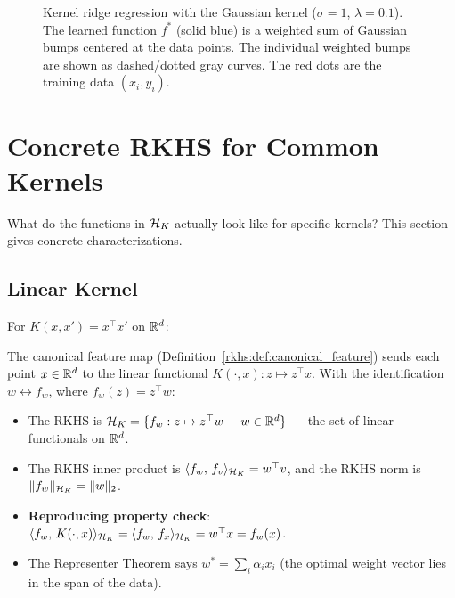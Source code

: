 \begin{notechapter}
\begin{figure}[ht]
\caption{Kernel ridge regression with the Gaussian kernel ($\sigma=1$,
$\lambda=0.1$). The learned function $f^*$ (solid blue) is a weighted
sum of Gaussian bumps centered at the data points. The individual
weighted bumps are shown as dashed/dotted gray curves. The red dots are
the training data $(x_i, y_i)$.}
\label{rkhs:fig:kernel_ridge}
\end{figure}

\section{Concrete RKHS for Common Kernels}
\label{rkhs:sec:examples_rkhs}

What do the functions in $\mathcal{H}_K$ actually look like for specific kernels?
This section gives concrete characterizations.

\subsection{Linear Kernel}

For $K(x,x') = x^\top x'$ on $\mathbb{R}^d$:

The canonical feature map
(Definition~\ref{rkhs:def:canonical_feature}) sends each
point $x \in \mathbb{R}^d$ to the linear functional
$K(\cdot, x): z \mapsto z^\top x$. With the
identification $w \leftrightarrow f_w$, where
$f_w(z) = z^\top w$:
\begin{itemize}
  \item The RKHS is
    $\mathcal{H}_K = \{f_w : z \mapsto z^\top w \;\mid\;
    w \in \mathbb{R}^d\}$ --- the set of linear functionals
    on $\mathbb{R}^d$.
  \item The RKHS inner product is
    $\langle f_w,\, f_v \rangle_{\mathcal{H}_K} = w^\top v$, and the
    RKHS norm is $\| f_w \|_{\mathcal{H}_K} = \| w \|_2$.
  \item \textbf{Reproducing property check}:
    $\langle f_w,\, K(\cdot,x) \rangle_{\mathcal{H}_K}
    = \langle f_w,\, f_x \rangle_{\mathcal{H}_K} = w^\top x
    = f_w(x)$. \checkmark
  \item The Representer Theorem says
    $w^* = \sum_i \alpha_i x_i$ (the optimal weight
    vector lies in the span of the data).
\end{itemize}


\end{notechapter}
